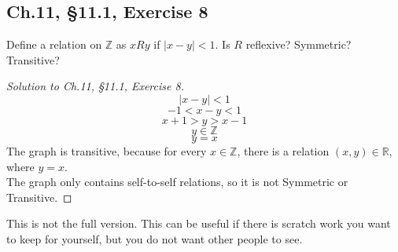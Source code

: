 \documentclass[12pt]{amsart}
\numberwithin{equation}{section}
\theoremstyle{definition}
\theoremstyle{remark}
\newif\ifnotes
\begin{document}


\subsection*{Ch.11, \S 11.1,  Exercise 8}  Define a relation on $ \mathbb{Z} $ as $ x\textit{R}y $ if $ |x - y| < 1 $. Is $ R $ reflexive? Symmetric? Transitive?


\begin{proof}[Solution to Ch.11, \S 11.1,  Exercise 8] \ \\
$$ |x - y| < 1 $$
$$ -1 < x - y < 1 $$
$$ x + 1 > y > x - 1 $$
$$ y \in \mathbb{Z} $$
$$ y = x $$
The graph is transitive, because for every $ x \in \mathbb{Z} $, there is a relation $ (x, y) \in \mathbb{R} $, where $ y = x $. \\
The graph only contains self-to-self relations, so it is not Symmetric or Transitive.


\end{proof}




\ifnotes


\else
	This is not the full version.  This can be useful if there is scratch work you want to keep for yourself, but you do not want other people to see. 
\fi





\end{document}
